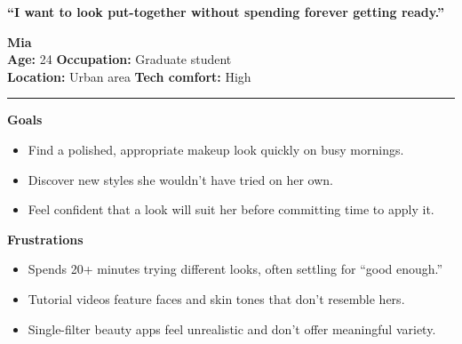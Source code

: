\documentclass[11pt, letterpaper]{article}
\begin{document}
\begin{tcolorbox}[
    colback=white,
    colframe=black!70,
    title={\large\bfseries Primary Persona: Mia},
    fonttitle=\bfseries,
    boxrule=1pt,
    arc=3mm,
    top=4mm, bottom=4mm, left=4mm, right=4mm
]

\begin{minipage}[t]{0.35\textwidth}
    \centering
    \vspace{0pt}

    \vspace{6pt}
    \textbf{``I want to look put-together without spending forever getting ready.''}
\end{minipage}
\hfill
\begin{minipage}[t]{0.6\textwidth}
    \vspace{0pt}
    {\large\bfseries Mia} \\[4pt]
    \textbf{Age:} 24 \quad \textbf{Occupation:} Graduate student \\
    \textbf{Location:} Urban area \quad \textbf{Tech comfort:} High
\end{minipage}

\vspace{8pt}
\hrule
\vspace{8pt}

\textbf{\large Goals}
\begin{itemize}[leftmargin=*, nosep, topsep=2pt]
    \item Find a polished, appropriate makeup look quickly on busy mornings.
    \item Discover new styles she wouldn't have tried on her own.
    \item Feel confident that a look will suit her before committing time to apply it.
\end{itemize}

\vspace{6pt}
\textbf{\large Frustrations}
\begin{itemize}[leftmargin=*, nosep, topsep=2pt]
    \item Spends 20+ minutes trying different looks, often settling for ``good enough.''
    \item Tutorial videos feature faces and skin tones that don't resemble hers.
    \item Single-filter beauty apps feel unrealistic and don't offer meaningful variety.
\end{itemize}


\end{tcolorbox}
\end{document}
